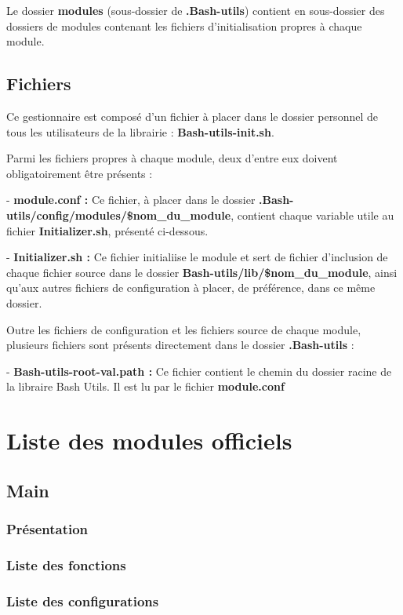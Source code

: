 \documentclass[a4paper,10pt]{article}
\begin{document}
  Le dossier \textbf{\color{lime}modules\color{white}} (sous-dossier de \textbf{\color{lime}.Bash-utils\color{white}}) contient en sous-dossier des dossiers de modules contenant les fichiers d'initialisation propres à chaque module.

  \color{green}
  \subsection{Fichiers}\color{white}
  Ce gestionnaire est composé d'un fichier à placer dans le dossier personnel de tous les utilisateurs de la librairie :  \textbf{\color{lime}Bash-utils-init.sh\color{white}}.\linebreak

  Parmi les fichiers propres à chaque module, deux d'entre eux doivent obligatoirement être présents :\linebreak

  - \textbf{\color{lime}module.conf\color{white} :} Ce fichier, à placer dans le dossier \textbf{\color{lime}.Bash-utils/config/modules/\$nom\_du\_module\color{white}}, contient chaque variable utile au fichier \textbf{\color{lime}Initializer.sh\color{white}}, présenté ci-dessous.\linebreak

  - \textbf{\color{lime}Initializer.sh\color{white} :} Ce fichier initialiise le module et sert de fichier d'inclusion de chaque fichier source dans le dossier \textbf{\color{lime}Bash-utils/lib/\$nom\_du\_module\color{white}}, ainsi qu'aux autres fichiers de configuration à placer, de préférence, dans ce même dossier.\linebreak

  Outre les fichiers de configuration et les fichiers source de chaque module, plusieurs fichiers sont présents directement dans le dossier \textbf{\color{lime}.Bash-utils\color{white}} :\linebreak

  - \textbf{\color{lime}Bash-utils-root-val.path\color{white} :} Ce fichier contient le chemin du dossier racine de la libraire Bash Utils. Il est lu par le fichier \textbf{\color{lime}module.conf\color{white}}

 \color{red}
 \section{Liste des modules officiels}\color{white}

  \color{green}
  \subsection{Main}\color{white}

  \color{blue}
  \subsubsection{Présentation}\color{white}

  \color{blue}
  \subsubsection{Liste des fonctions}\color{white}

  \color{blue}
  \subsubsection{Liste des configurations}\color{white}
    
\end{document}
